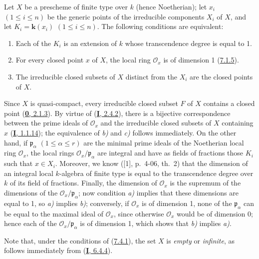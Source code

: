 \begin{proposition}[7.4.1]
\label{II.7.4.1}
Let $X$ be a prescheme of finite type over $k$ (hence Noetherian); let $x_i$
$(1\leq i\leq n)$ be the generic points of the irreducible components $X_i$ of
$X$, and let $K_i=\boldsymbol{k}(x_i)$ $(1\leq i\leq n)$. The following conditions are
equivalent:
\begin{enumerate}
\item[\rm a)] Each of the $K_i$ is an extension of $k$ whose transcendence
degree is equal to 1.
\item[\rm b)] For every closed point $x$ of $X$, the local ring
$\mathcal{O}_x$ is of dimension 1 \textup{(\hyperref[II.7.1.5]{7.1.5})}.
\item[\rm c)] The irreducible closed subsets of $X$ distinct from the $X_i$
are the closed points of $X$.
\end{enumerate}
\end{proposition}

Since $X$ is quasi-compact, every irreducible closed subset $F$ of $X$
contains a closed point (\hyperref[0.2.1.3]{\textbf{0}, 2.1.3}). By virtue of
(\hyperref[I.2.4.2]{\textbf{I}, 2.4.2}), there is a bijective correspondence between the
prime ideals of $\mathcal{O}_x$ and the irreducible closed subsets of $X$
containing $x$ (\hyperref[I.1.1.14]{\textbf{I}, 1.1.14}); the equivalence of \emph{b)} and \emph{c)}
follows immediately. On the other hand, if $\mathfrak{p}_\alpha$
$(1\leq\alpha\leq r)$ are the minimal prime ideals of the Noetherian local
ring $\mathcal{O}_x$, the local rings
$\mathcal{O}_x/\mathfrak{p}_\alpha$ are integral and have as fields of
fractions those $K_i$ such that $x\in X_i$. Moreover, we know ([1],
p.~4-06, th.~2) that the dimension of an integral local $k$-algebra of finite
type is equal to the transcendence degree over $k$ of its field of fractions.
Finally, the dimension of $\mathcal{O}_x$ is the supremum of the dimensions of the
$\mathcal{O}_x/\mathfrak{p}_\alpha$; now condition \emph{a)} implies that these
dimensions are equal to 1, so \emph{a)} implies \emph{b)}; conversely, if
$\mathcal{O}_x$ is of dimension 1, none of the $\mathfrak{p}_\alpha$ can
be equal to the maximal ideal of $\mathcal{O}_x$, since otherwise $\mathcal{O}_x$
would be of dimension 0; hence each of the
$\mathcal{O}_x/\mathfrak{p}_\alpha$ is of dimension 1, which shows that \emph{b)}
implies \emph{a)}.

Note that, under the conditions of (\hyperref[II.7.4.1]{7.4.1}),
the set $X$ is \emph{empty} or \emph{infinite}, as follows immediately from
(\hyperref[I.6.4.4]{\textbf{I}, 6.4.4}).

